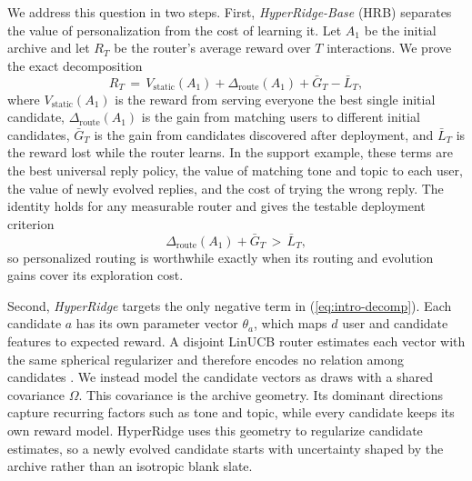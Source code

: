 \documentclass{article} %
\renewcommand{\eqref}[1]{\textup{(\ref{#1})}}
\begin{document}
We address this question in two steps. First, \emph{HyperRidge-Base} (HRB) separates the value of personalization from the cost of learning it. Let $A_1$ be the initial archive and let $R_T$ be the router's average reward over $T$ interactions. We prove the exact decomposition
\begin{equation}
\label{eq:intro-decomp}
R_T
\,=\,
V_{\mathrm{static}}(A_1)
+
\Delta_{\mathrm{route}}(A_1)
+
\bar G_T
-
\bar L_T ,
\end{equation}
where $V_{\mathrm{static}}(A_1)$ is the reward from serving everyone the best single initial candidate, $\Delta_{\mathrm{route}}(A_1)$ is the gain from matching users to different initial candidates, $\bar G_T$ is the gain from candidates discovered after deployment, and $\bar L_T$ is the reward lost while the router learns. In the support example, these terms are the best universal reply policy, the value of matching tone and topic to each user, the value of newly evolved replies, and the cost of trying the wrong reply. The identity holds for any measurable router and gives the testable deployment criterion
\begin{equation}
\label{eq:intro-dominance}
\Delta_{\mathrm{route}}(A_1) + \bar G_T \,>\, \bar L_T ,
\end{equation}
so personalized routing is worthwhile exactly when its routing and evolution gains cover its exploration cost.

Second, \emph{HyperRidge} targets the only negative term in \eqref{eq:intro-decomp}. Each candidate $a$ has its own parameter vector $\theta_a$, which maps $d$ user and candidate features to expected reward. A disjoint LinUCB router estimates each vector with the same spherical regularizer and therefore encodes no relation among candidates \citep{abbasi2011oful,chu2011linucb}. We instead model the candidate vectors as draws with a shared covariance $\Omega$. This covariance is the archive geometry. Its dominant directions capture recurring factors such as tone and topic, while every candidate keeps its own reward model. HyperRidge uses this geometry to regularize candidate estimates, so a newly evolved candidate starts with uncertainty shaped by the archive rather than an isotropic blank slate.
\end{document}
